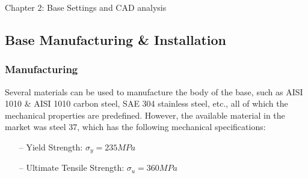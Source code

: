 \documentclass{book}
\begin{document}
\begin{chapter}{Chapter 2: Base Settings and CAD analysis}
\newpage

\subsection{Base Manufacturing \& Installation }

\subsubsection{Manufacturing}

Several materials can be used to manufacture the body of the base, such as AISI 1010 \& AISI 1010 carbon steel, SAE 304 stainless steel, etc., all of which the mechanical properties are predefined. However, the available material in the market was steel 37, which has the following mechanical specifications:

\begin{itemize}
	\item[--] Yield Strength: $\sigma_{y} = 235 MPa$
	\item[--] Ultimate Tensile Strength: $\sigma_{u} = 360 MPa$
\end{itemize}



\end{chapter}
\end{document}
